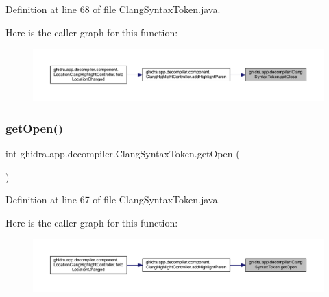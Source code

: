 Definition at line 68 of file Clang\+Syntax\+Token.\+java.

Here is the caller graph for this function\+:
\nopagebreak
\begin{figure}[H]
\begin{center}
\leavevmode
\includegraphics[width=350pt]{classghidra_1_1app_1_1decompiler_1_1_clang_syntax_token_ab1f9a990950333ae4cbc02fe177fb7a8_icgraph}
\end{center}
\end{figure}
\mbox{\label{classghidra_1_1app_1_1decompiler_1_1_clang_syntax_token_ab1a7b47c4554b795b62e62b00a15f84c}} 
\subsubsection{\texorpdfstring{getOpen()}{getOpen()}}
{\footnotesize\ttfamily int ghidra.\+app.\+decompiler.\+Clang\+Syntax\+Token.\+get\+Open (\begin{DoxyParamCaption}{ }\end{DoxyParamCaption})\hspace{0.3cm}{\ttfamily [inline]}}



Definition at line 67 of file Clang\+Syntax\+Token.\+java.

Here is the caller graph for this function\+:
\nopagebreak
\begin{figure}[H]
\begin{center}
\leavevmode
\includegraphics[width=350pt]{classghidra_1_1app_1_1decompiler_1_1_clang_syntax_token_ab1a7b47c4554b795b62e62b00a15f84c_icgraph}
\end{center}
\end{figure}
\mbox{\label{classghidra_1_1app_1_1decompiler_1_1_clang_syntax_token_a10e5b7651f2b00e4d5daf4e04e2045f1}} 
